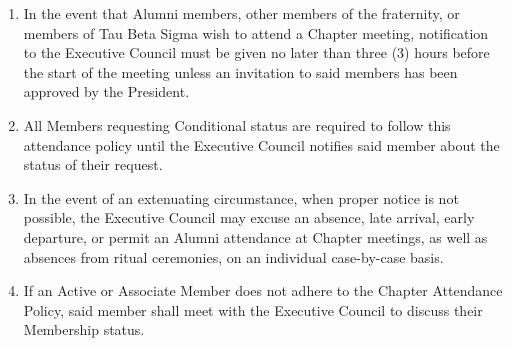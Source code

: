 \documentclass[11pt]{article}
\begin{document}
\begin{enumerate}[label=\bfseries Article \Roman*]
\item
  In the event that Alumni members, other members of the fraternity, or members of Tau Beta Sigma wish to attend a Chapter meeting, notification to the Executive Council must be given no later than three (3) hours before the start of the meeting unless an invitation to said members has been approved by the President.

\item
  All Members requesting Conditional status are required to follow this attendance policy until the Executive Council notifies said member about the status of their request.

\item
  In the event of an extenuating circumstance, when proper notice is not possible, the Executive Council may excuse an absence, late arrival, early departure, or permit an Alumni attendance at Chapter meetings, as well as absences from ritual ceremonies, on an individual case-by-case basis.

\item
  If an Active or Associate Member does not adhere to the Chapter Attendance Policy, said member shall meet with the Executive Council to discuss their Membership status.
\end{enumerate}
\end{document}

